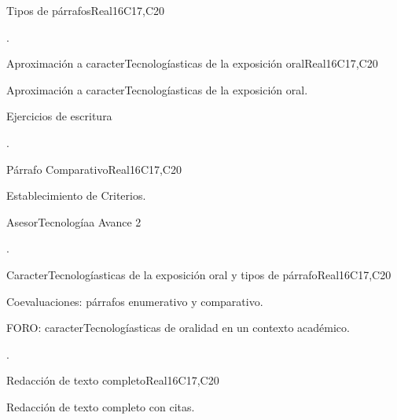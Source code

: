 \begin{syllabus}
\begin{unit}{Tipos de párrafos}{}{Real}{16}{C17,C20}
  \begin{learningoutcomes}
   \item .%
  \end{learningoutcomes}
\end{unit}

\begin{unit}{Aproximación a caracterTecnologíasticas de la exposición oral}{}{Real}{16}{C17,C20}
  \begin{topics}
      \item Aproximación a caracterTecnologíasticas de la exposición oral.
      \item Ejercicios de escritura
  \end{topics}

  \begin{learningoutcomes}
   \item .%
  \end{learningoutcomes}
\end{unit}

\begin{unit}{Párrafo Comparativo}{}{Real}{16}{C17,C20}
  \begin{topics}
      \item Establecimiento de Criterios.
      \item AsesorTecnologíaa Avance 2 
  \end{topics}

  \begin{learningoutcomes}
   \item .%
  \end{learningoutcomes}
\end{unit}

\begin{unit}{CaracterTecnologíasticas de la exposición oral y tipos de párrafo}{}{Real}{16}{C17,C20}
  \begin{topics}
      \item Coevaluaciones: párrafos enumerativo y comparativo.
      \item FORO: caracterTecnologíasticas de oralidad en un contexto académico.
  \end{topics}

  \begin{learningoutcomes}
   \item .%
  \end{learningoutcomes}
\end{unit}

\begin{unit}{Redacción de texto completo}{}{Real}{16}{C17,C20}
  \begin{topics}
      \item Redacción de texto completo con citas.
  \end{topics}


\end{unit}
\end{syllabus}
